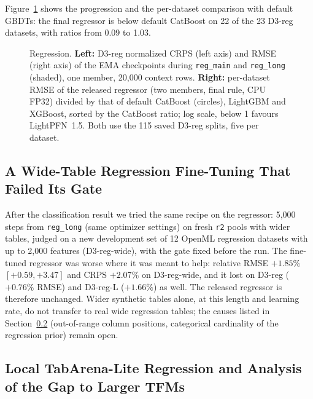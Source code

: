 \documentclass[11pt]{article}
\begin{document}
Figure~\ref{fig:reg} shows the progression and the per-dataset comparison with default GBDTs: the final regressor is below default CatBoost on 22 of the 23 D3-reg datasets, with ratios from 0.09 to 1.03.

\begin{figure}[tbp]
\centering
\resizebox{\linewidth}{!}{}
\caption{Regression. \textbf{Left:} D3-reg normalized CRPS (left axis) and RMSE (right axis) of the EMA checkpoints during \texttt{reg\_main} and \texttt{reg\_long} (shaded), one member, 20,000 context rows. \textbf{Right:} per-dataset RMSE of the released regressor (two members, final rule, CPU FP32) divided by that of default CatBoost (circles), LightGBM and XGBoost, sorted by the CatBoost ratio; log scale, below 1 favours LightPFN~1.5. Both use the 115 saved D3-reg splits, five per dataset.}
\label{fig:reg}
\end{figure}

\subsection{A Wide-Table Regression Fine-Tuning That Failed Its Gate}
\label{sec:reg-wide}

After the classification result we tried the same recipe on the regressor: 5,000 steps from \texttt{reg\_long} (same optimizer settings) on fresh \texttt{r2} pools with wider tables, judged on a new development set of 12 OpenML regression datasets with up to 2,000 features (D3-reg-wide), with the gate fixed before the run. The fine-tuned regressor was worse where it was meant to help: relative RMSE $+1.85\%$ $[+0.59, +3.47]$ and CRPS $+2.07\%$ on D3-reg-wide, and it lost on D3-reg ($+0.76\%$ RMSE) and D3-reg-L ($+1.66\%$) as well. The released regressor is therefore unchanged. Wider synthetic tables alone, at this length and learning rate, do not transfer to real wide regression tables; the causes listed in Section~\ref{sec:reg-gap} (out-of-range column positions, categorical cardinality of the regression prior) remain open. %

\subsection{Local TabArena-Lite Regression and Analysis of the Gap to Larger TFMs}
\label{sec:reg-gap}
\end{document}
